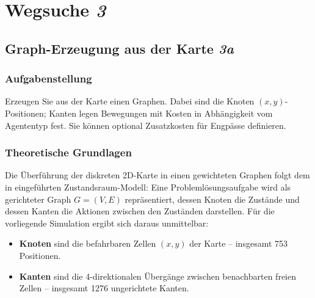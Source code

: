 
\chapter{Wegsuche \textit{3}}
\label{chap:aufgabe3}
\thispagestyle{fancy}


\section{Graph-Erzeugung aus der Karte \textit{3a}}
\label{sec:aufgabe3a}

\subsection{Aufgabenstellung}

Erzeugen Sie aus der Karte einen Graphen. Dabei sind die Knoten \((x,y)\)-Positionen; Kanten legen Bewegungen mit Kosten in Abhängigkeit vom Agententyp fest. Sie können optional Zusatzkosten für Engpässe definieren.

\subsection{Theoretische Grundlagen}

Die Überführung der diskreten \acs{2D}-Karte in einen gewichteten Graphen folgt dem in \textcite[S. 67\,ff.]{4} eingeführten Zustandsraum-Modell: Eine Problemlösungsaufgabe wird als gerichteter Graph \(G = (V, E)\) repräsentiert, dessen Knoten die Zustände und dessen Kanten die Aktionen zwischen den Zuständen darstellen. Für die vorliegende Simulation ergibt sich daraus unmittelbar:
\begin{itemize}
    \item \textbf{Knoten} sind die befahrbaren Zellen \((x, y)\) der Karte -- insgesamt 753 Positionen.
    \item \textbf{Kanten} sind die 4-direktionalen Übergänge zwischen benachbarten freien Zellen -- insgesamt 1276 ungerichtete Kanten.
\end{itemize}


